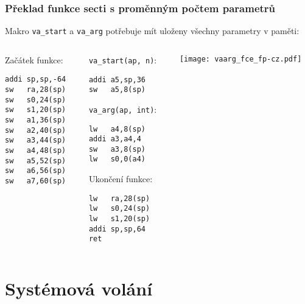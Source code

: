 \documentclass{beamer}
\begin{document}
\begin{frame}[fragile,shrink=5]
\frametitle{Překlad funkce secti s proměnným počtem parametrů}

Makro \texttt{va\_start} a \texttt{va\_arg} potřebuje mít uloženy všechny parametry v paměti:

\begin{columns}
\begin{column}{0.25\textwidth}
Začátek funkce:

\begin{verbatim}
addi sp,sp,-64
sw   ra,28(sp)
sw   s0,24(sp)
sw   s1,20(sp)
sw   a1,36(sp)
sw   a2,40(sp)
sw   a3,44(sp)
sw   a4,48(sp)
sw   a5,52(sp)
sw   a6,56(sp)
sw   a7,60(sp)
\end{verbatim}
\end{column}   
\begin{column}{0.4\textwidth}
\texttt{va\_start(ap, n)}:

\begin{verbatim}
addi a5,sp,36
sw   a5,8(sp)
\end{verbatim}
\texttt{va\_arg(ap, int)}:
\begin{verbatim}
lw   a4,8(sp)
addi a3,a4,4
sw   a3,8(sp)
lw   s0,0(a4)
\end{verbatim}

Ukončení funkce:

\begin{verbatim}
lw   ra,28(sp)
lw   s0,24(sp)
lw   s1,20(sp)
addi sp,sp,64
ret
\end{verbatim}
\end{column}
\begin{column}{0.3\textwidth}  
\texttt{[image: vaarg\_fce\_fp-cz.pdf]}
\end{column}
\end{columns}
\end{frame}


\section {Systémová volání}
\end{document}
